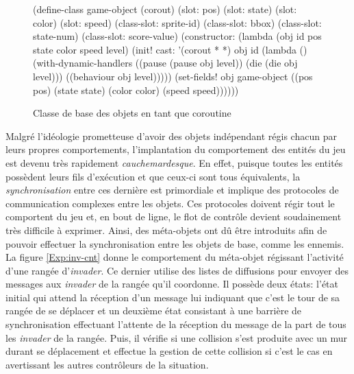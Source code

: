 \documentclass[12pt,oneside,letterpaper,francais]{book}
\newcommand{\scheme}[1]{\selectlanguage{english}{\tt #1}\selectlanguage{french}}
\begin{document}
\begin{figure}[htb!]
  \begin{schemecode}
(define-class game-object (corout)
  (slot: pos)
  (slot: state)
  (slot: color)
  (slot: speed)
  (class-slot: sprite-id)
  (class-slot: bbox)
  (class-slot: state-num)
  (class-slot: score-value)
  (constructor: (lambda (obj id pos state color speed level)
                  (init! cast: '(corout * *) obj id
                         (lambda ()(with-dynamic-handlers
                                    ((pause (pause obj level))
                                     (die   (die   obj level)))
                                    ((behaviour obj level)))))
                  (set-fields! obj game-object
                    ((pos pos)     (state state)
                     (color color) (speed speed))))))
  \end{schemecode}
  \caption{Classe de base des objets en tant que coroutine}
  \label{Exp:si3-class}
\end{figure}

Malgré l'idéologie prometteuse d'avoir des objets indépendant régis
chacun par leurs propres comportements, l'implantation du comportement
des entités du jeu est devenu très rapidement
\emph{cauchemardesque}. En effet, puisque toutes les entités possèdent
leurs fils d'exécution et que ceux-ci sont tous équivalents, la
\emph{synchronisation} entre ces dernière est primordiale et implique
des protocoles de communication complexes entre les objets. Ces
protocoles doivent régir tout le comportent du jeu et, en bout de
ligne, le flot de contrôle devient soudainement très difficile à
exprimer. Ainsi, des méta-objets ont dû être introduits afin de
pouvoir effectuer la synchronisation entre les objets de base, comme
les ennemis. La figure \ref{Exp:inv-cnt} donne le comportement du
méta-objet régissant l'activité d'une rangée d'\textit{invader}. Ce
dernier utilise des listes de diffusions pour envoyer des messages aux
\textit{invader} de la rangée qu'il coordonne. Il possède deux états:
l'état initial qui attend la réception d'un message lui indiquant que
c'est le tour de sa rangée de se déplacer et un deuxième état
consistant à une barrière de synchronisation effectuant l'attente de
la réception du message \scheme{moved} de la part de tous les
\textit{invader} de la rangée. Puis, il vérifie si une collision s'est
produite avec un mur durant se déplacement et effectue la gestion de
cette collision si c'est le cas en avertissant les autres contrôleurs
de la situation.
\end{document}
